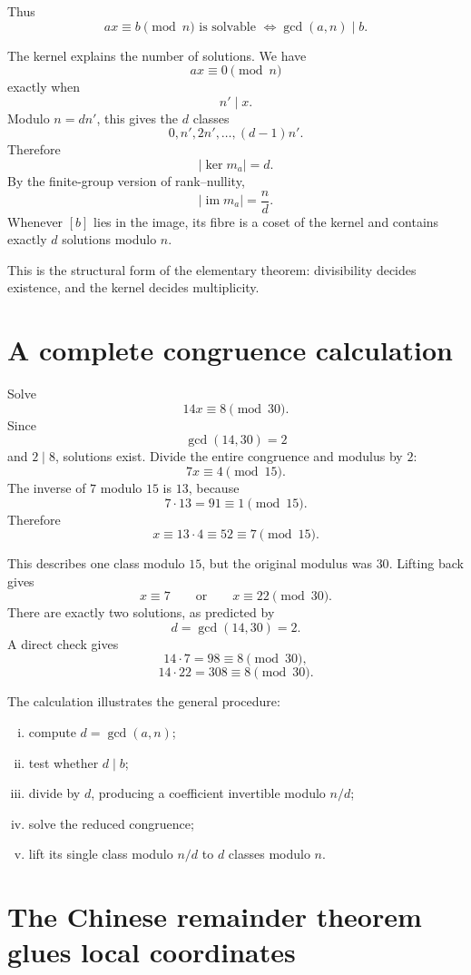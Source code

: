 Thus
\[
  \boxed{
  ax\equiv b\pmod n
  \text{ is solvable }
  \Longleftrightarrow
  \gcd(a,n)\mid b.}
\]

The kernel explains the number of solutions.  We have
\[
  ax\equiv0\pmod n
\]
exactly when
\[
  n'\mid x.
\]
Modulo \(n=dn'\), this gives the \(d\) classes
\[
  0,n',2n',\ldots,(d-1)n'.
\]
Therefore
\[
  |\ker m_a|=d.
\]
By the finite-group version of rank--nullity,
\[
  |\operatorname{im}m_a|=\frac nd.
\]
Whenever \([b]\) lies in the image, its fibre is a coset of the kernel and contains exactly \(d\) solutions modulo \(n\).

This is the structural form of the elementary theorem: divisibility decides existence, and the kernel decides multiplicity.

\section{A complete congruence calculation}

Solve
\[
  14x\equiv8\pmod{30}.
\]
Since
\[
  \gcd(14,30)=2
\]
and \(2\mid8\), solutions exist.  Divide the entire congruence and modulus by \(2\):
\[
  7x\equiv4\pmod{15}.
\]
The inverse of \(7\) modulo \(15\) is \(13\), because
\[
  7\cdot13=91\equiv1\pmod{15}.
\]
Therefore
\[
  x\equiv13\cdot4
  \equiv52
  \equiv7\pmod{15}.
\]

This describes one class modulo \(15\), but the original modulus was \(30\).  Lifting back gives
\[
  x\equiv7
  \qquad\text{or}\qquad
  x\equiv22\pmod{30}.
\]
There are exactly two solutions, as predicted by
\[
  d=\gcd(14,30)=2.
\]
A direct check gives
\[
  14\cdot7=98\equiv8\pmod{30},
\]
\[
  14\cdot22=308\equiv8\pmod{30}.
\]

The calculation illustrates the general procedure:

\begin{enumerate}[(i)]
  \item compute \(d=\gcd(a,n)\);
  \item test whether \(d\mid b\);
  \item divide by \(d\), producing a coefficient invertible modulo \(n/d\);
  \item solve the reduced congruence;
  \item lift its single class modulo \(n/d\) to \(d\) classes modulo \(n\).
\end{enumerate}

\section{The Chinese remainder theorem glues local coordinates}

